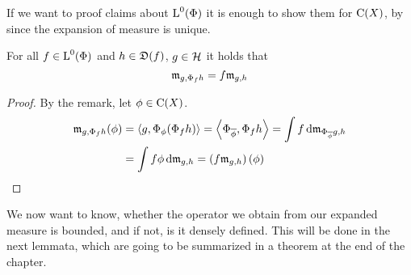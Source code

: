 \begin{rem}

If we want to proof claims about ${\text{L}^0}(\Phi)$ it is enough to show them for 
$\operatorname{C}(X)$, by since the expansion of measure is unique.
 
\end{rem}

\begin{lem} \label{lemlinm}
 
  For all $f \in {\text{L}^0}(\Phi)$ and $h \in \mathfrak{D}(f)$, $g\in \mathcal{H}$ it holds that
 \[
 \mathfrak{m}_{g, \Phi_f h} = f\mathfrak{m}_{g,h}
 \]

\end{lem}

\begin{proof}
 By the remark, let $\phi \in \operatorname{C}(X)$.
 \begin{align*}
   \mathfrak{m}_{g, \Phi_f h}(\phi) &= \left\langle g, \Phi_\phi (\Phi_f h) \right\rangle 
			  = \left\langle \Phi_{\overline{\phi}} , \Phi_f h \right\rangle
			  = \int f \operatorname{d}\! \mathfrak{m}_{\Phi_{\overline{\phi}} g, h}\\
			  &= \int f \phi \operatorname{d}\! \mathfrak{m}_{g,h}
			  = \left( f \mathfrak{m}_{g,h} \right)(\phi)
 \end{align*}

\end{proof}

We now want to know, whether the operator we obtain from our expanded measure
is bounded, and if not, is it densely defined. This will be done in the next
lemmata, which are going to be summarized in a theorem at the end of the
chapter.

